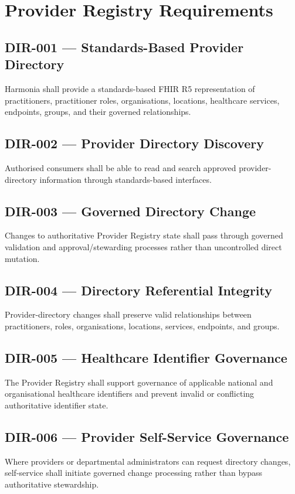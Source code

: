 \section{Provider Registry Requirements}

\subsection{DIR-001 --- Standards-Based Provider Directory}
Harmonia shall provide a standards-based FHIR R5 representation of practitioners, practitioner roles, organisations, locations, healthcare services, endpoints, groups, and their governed relationships.

\subsection{DIR-002 --- Provider Directory Discovery}
Authorised consumers shall be able to read and search approved provider-directory information through standards-based interfaces.

\subsection{DIR-003 --- Governed Directory Change}
Changes to authoritative Provider Registry state shall pass through governed validation and approval/stewarding processes rather than uncontrolled direct mutation.

\subsection{DIR-004 --- Directory Referential Integrity}
Provider-directory changes shall preserve valid relationships between practitioners, roles, organisations, locations, services, endpoints, and groups.

\subsection{DIR-005 --- Healthcare Identifier Governance}
The Provider Registry shall support governance of applicable national and organisational healthcare identifiers and prevent invalid or conflicting authoritative identifier state.

\subsection{DIR-006 --- Provider Self-Service Governance}
Where providers or departmental administrators can request directory changes, self-service shall initiate governed change processing rather than bypass authoritative stewardship.

